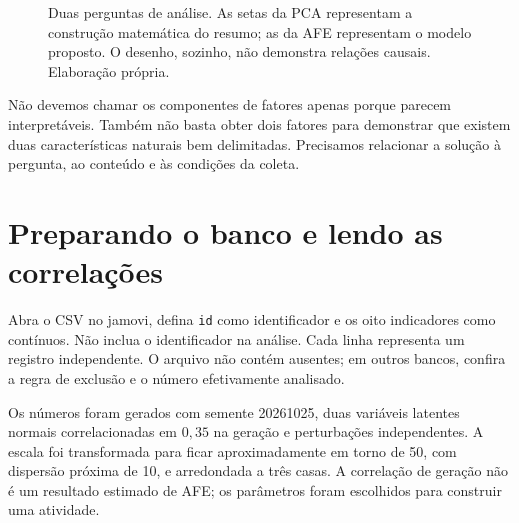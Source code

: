 \begin{figure}[H]
\centering
{}
\caption{Duas perguntas de análise. As setas da PCA representam a construção matemática do resumo; as da AFE representam o modelo proposto. O desenho, sozinho, não demonstra relações causais. Elaboração própria.}
\label{fig:pca-afe-perguntas}
\end{figure}

Não devemos chamar os componentes de fatores apenas porque parecem interpretáveis. Também não basta obter dois fatores para demonstrar que existem duas características naturais bem delimitadas. Precisamos relacionar a solução à pergunta, ao conteúdo e às condições da coleta.

\section{Preparando o banco e lendo as correlações}

Abra o CSV no jamovi, defina \texttt{id} como identificador e os oito indicadores como contínuos. Não inclua o identificador na análise. Cada linha representa um registro independente. O arquivo não contém ausentes; em outros bancos, confira a regra de exclusão e o número efetivamente analisado.

Os números foram gerados com semente 20261025, duas variáveis latentes normais correlacionadas em $0{,}35$ na geração e perturbações independentes. A escala foi transformada para ficar aproximadamente em torno de 50, com dispersão próxima de 10, e arredondada a três casas. A correlação de geração não é um resultado estimado de AFE; os parâmetros foram escolhidos para construir uma atividade.

